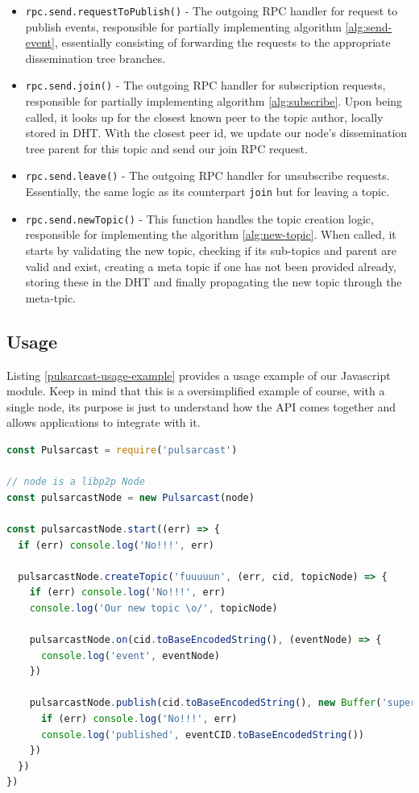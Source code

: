 \begin{itemize}
  \item
    \verb|rpc.send.requestToPublish()| - The outgoing RPC handler for request to publish events, responsible for partially implementing algorithm \ref{alg:send-event}, essentially consisting of forwarding the requests to the appropriate dissemination tree branches.
  \item
    \verb|rpc.send.join()| - The outgoing RPC handler for subscription requests, responsible for partially implementing algorithm \ref{alg:subscribe}. Upon being called, it looks up for the closest known peer to the topic author, locally stored in DHT. With the closest peer id, we update our node's dissemination tree parent for this topic and send our join RPC request.
  \item
    \verb|rpc.send.leave()| - The outgoing RPC handler for unsubscribe requests. Essentially, the same logic as its counterpart \verb|join| but for leaving a topic.
  \item
    \verb|rpc.send.newTopic()| - This function handles the topic creation logic, responsible for implementing the algorithm \ref{alg:new-topic}.  When called, it starts by validating the new topic, checking if its sub-topics and parent are valid and exist, creating a meta topic if one has not been provided already, storing these in the DHT and finally propagating the new topic through the meta-tpic.
\end{itemize}

\subsection{Usage}\label{subsec:usage}

Listing \ref{pulsarcast-usage-example} provides a usage example of our
Javascript module. Keep in mind that this is a oversimplified example of
course, with a single node, its purpose is just to understand how the API comes
together and allows applications to integrate with it.

\begin{lstlisting}[language=JavaScript, float=h, caption={Usage example of our Pulsarcast module},label={pulsarcast-usage-example}]
const Pulsarcast = require('pulsarcast')

// node is a libp2p Node
const pulsarcastNode = new Pulsarcast(node)

const pulsarcastNode.start((err) => {
  if (err) console.log('No!!!', err)
  
  pulsarcastNode.createTopic('fuuuuun', (err, cid, topicNode) => {
    if (err) console.log('No!!!', err)
    console.log('Our new topic \o/', topicNode)
    
    pulsarcastNode.on(cid.toBaseEncodedString(), (eventNode) => {
      console.log('event', eventNode)
    })
    
    pulsarcastNode.publish(cid.toBaseEncodedString(), new Buffer('super fun!'), (err, eventCID) => {
      if (err) console.log('No!!!', err)
      console.log('published', eventCID.toBaseEncodedString())
    })
  })
})
\end{lstlisting}

